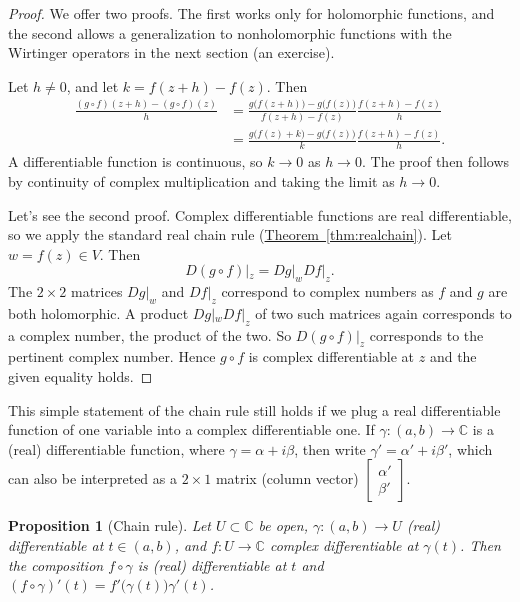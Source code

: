 \documentclass[12pt,openany]{book}
\newcommand{\C}{{\mathbb{C}}}
\theoremstyle{plain}
\newtheorem{prop}[thm]{Proposition}
\theoremstyle{remark}
\theoremstyle{definition}
\theoremstyle{exercise}
\theoremstyle{example}
\newcommand{\thmref}[1]{\hyperref[#1]{Theorem~\ref*{#1}}}
\begin{document}
\begin{proof}
We offer two proofs.  The first works only for holomorphic
functions, and the second allows a generalization to nonholomorphic functions
with the Wirtinger operators in the next section (an exercise).

Let $h \not= 0$, and let $k = f(z+h) -f(z)$.  Then
\begin{equation*}
\begin{split}
\frac{(g \circ f)(z+h) - (g \circ f)(z)}{h}
& =
\frac{g \bigl( f(z+h) \bigr) - g\bigl( f(z) \bigr)}{f(z+h)-f(z)}
\frac{f(z+h)-f(z)}{h}
\\
& =
\frac{g \bigl( f(z) + k \bigr) - g\bigl( f(z) \bigr)}{k}
\frac{f(z+h)-f(z)}{h} .
\end{split}
\end{equation*}
A differentiable function is continuous, so $k \to 0$ as $h \to 0$.
The proof then follows by continuity of complex multiplication and taking
the limit as $h \to 0$.

Let's see the second proof.
Complex differentiable functions are real differentiable, so
we apply the standard real chain rule (\thmref{thm:realchain}).
Let $w = f(z) \in V$.  Then
\begin{equation*}
D(g \circ f)|_z = Dg|_w Df|_z .
\end{equation*}
The $2 \times 2$ matrices $Dg|_w$ and $Df|_z$ correspond to complex
numbers as $f$ and $g$ are both holomorphic.  A product $Dg|_w Df|_z$
of two such matrices again corresponds to a complex number, the product of
the two.
So $D(g \circ f)|_z$ corresponds to the pertinent complex number.
Hence $g \circ f$ is complex differentiable at $z$ and the given equality holds.
\end{proof}

This simple statement of the chain rule still holds
if we plug a real differentiable function of one variable
into a complex differentiable
one.  If $\gamma \colon (a,b)
\to \C$ is a (real) differentiable function, where
$\gamma = \alpha + i \beta$,
then write $\gamma' = \alpha' + i \beta'$, which can also be interpreted
as a $2 \times 1$ matrix (column vector)
$\left[\begin{smallmatrix}\alpha'\\\beta'\end{smallmatrix}\right]$.

\begin{prop}[Chain rule]
%
\label{prop:chainrule2}%
Let $U \subset \C$ be open,
$\gamma \colon (a,b) \to U$ (real) differentiable at $t \in (a,b)$,
and $f \colon U \to \C$ complex differentiable at $\gamma(t)$.
Then the composition $f \circ \gamma$ is (real) differentiable
at $t$ and $(f \circ \gamma)'(t) = f'\bigl(\gamma(t)\bigr) \gamma'(t)$.
\end{prop}
\end{document}
